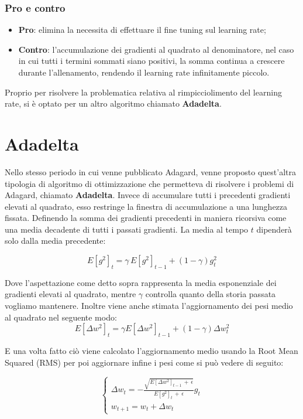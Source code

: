 \subsubsection{Pro e contro}
\begin{itemize}
    \item \textbf{Pro}: elimina la necessita di effettuare il fine tuning sul learning rate;
    \item \textbf{Contro}: l'accumulazione dei gradienti al quadrato al denominatore, nel caso in cui tutti i termini sommati siano positivi, la somma continua a crescere durante l'allenamento, rendendo il learning rate infinitamente piccolo.
\end{itemize}

Proprio per risolvere la problematica relativa al rimpicciolimento del learning rate, si è optato per un altro algoritmo chiamato \textbf{Adadelta}.

\section{Adadelta}
Nello stesso periodo in cui venne pubblicato Adagard, venne proposto quest'altra tipologia di algoritmo di ottimizzazione che permetteva di risolvere i problemi di Adagard, chiamato \textbf{Adadelta}. Invece di accumulare tutti i precedenti gradienti elevati al quadrato, esso restringe la finestra di accumulazione a una lunghezza fissata. Definendo la somma dei gradienti precedenti in maniera ricorsiva come una media decadente di tutti i passati gradienti. La media al tempo $t$ dipenderà solo dalla media precedente:

\begin{equation}
    E[g^2]_t = \gamma\,E[g^2]_{t-1} + (1-\gamma)g^2_t
\end{equation}

Dove l'aspettazione come detto sopra rappresenta la media esponenziale dei gradienti elevati al quadrato, mentre $\gamma$ controlla quanto della storia passata vogliamo mantenere. Inoltre viene anche stimata l'aggiornamento dei pesi medio al quadrato nel seguente modo:
\begin{equation}
    E[\Delta w^2]_t = \gamma E[\Delta w^2]_{t-1} + (1-\gamma)\Delta w^2_t
\end{equation}

E una volta fatto ciò viene calcolato l'aggiornamento medio usando la Root Mean Squared (RMS) per poi aggiornare infine i pesi come si può vedere di seguito:

\begin{equation}
    \left\{\begin{array}{c}
    \Delta w_t = - \frac{\sqrt{E[\Delta w^2]_{t-1}\,+\,\epsilon}}{E[g^2]_t\,+\,\epsilon}g_t\\
    w_{t+1}= w_t + \Delta w_t
    \end{array}
    \right.
\end{equation}


